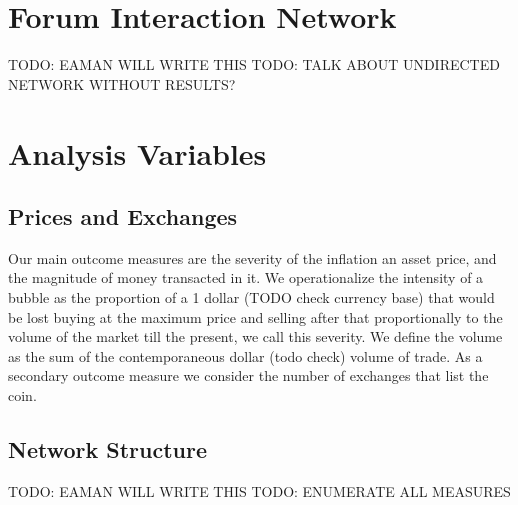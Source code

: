 \section{Forum Interaction Network}
TODO: EAMAN WILL WRITE THIS
TODO: TALK ABOUT UNDIRECTED NETWORK WITHOUT RESULTS?



\section{Analysis Variables}
\subsection{Prices and Exchanges}
Our main outcome measures are the severity of the inflation an asset price, and the magnitude of money transacted in it.
We operationalize the intensity of a bubble as the proportion of a 1 dollar (TODO check currency base) that would be lost buying at the maximum price and selling after that proportionally to the volume of the market till the present, we call this severity.
We define the volume as the sum of the contemporaneous dollar (todo check) volume of trade.
As a secondary outcome measure we consider the number of exchanges that list the coin.


\subsection{Network Structure}
TODO: EAMAN WILL WRITE THIS
TODO: ENUMERATE ALL MEASURES
